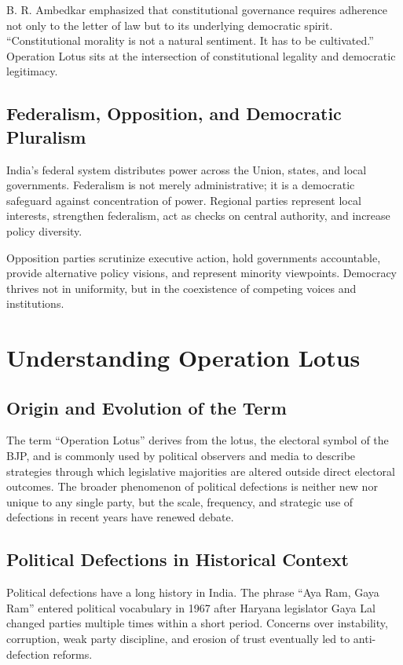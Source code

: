 \documentclass[11pt]{article}
\begin{document}
B. R. Ambedkar emphasized that constitutional governance requires adherence not only to the letter of law but to its underlying democratic spirit. ``Constitutional morality is not a natural sentiment. It has to be cultivated.'' Operation Lotus sits at the intersection of constitutional legality and democratic legitimacy.

\subsection{Federalism, Opposition, and Democratic Pluralism}
India's federal system distributes power across the Union, states, and local governments. Federalism is not merely administrative; it is a democratic safeguard against concentration of power. Regional parties represent local interests, strengthen federalism, act as checks on central authority, and increase policy diversity.

Opposition parties scrutinize executive action, hold governments accountable, provide alternative policy visions, and represent minority viewpoints. Democracy thrives not in uniformity, but in the coexistence of competing voices and institutions.

\section{Understanding Operation Lotus}
\subsection{Origin and Evolution of the Term}
The term ``Operation Lotus'' derives from the lotus, the electoral symbol of the BJP, and is commonly used by political observers and media to describe strategies through which legislative majorities are altered outside direct electoral outcomes. The broader phenomenon of political defections is neither new nor unique to any single party, but the scale, frequency, and strategic use of defections in recent years have renewed debate.

\subsection{Political Defections in Historical Context}
Political defections have a long history in India. The phrase ``Aya Ram, Gaya Ram'' entered political vocabulary in 1967 after Haryana legislator Gaya Lal changed parties multiple times within a short period. Concerns over instability, corruption, weak party discipline, and erosion of trust eventually led to anti-defection reforms.
\end{document}
